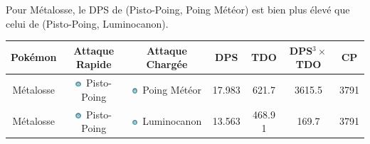 \documentclass[12pt]{beamer}
\newcommand{\psysimp}{\includegraphics[height=0.2cm]{../../../images/type/simplified/psy.png}}
\newcommand{\steelsimp}{\includegraphics[height=0.2cm]{../../../images/type/simplified/steel.png}}
\begin{document}
\begin{frame}
\begin{block}{}
\begin{footnotesize}
\begin{itemize}
Pour Métalosse, le DPS de (Pisto-Poing, Poing Météor) est bien plus élevé que celui de (Pisto-Poing, Luminocanon).
\begin{center}
\begin{tabular}{ccccccc}
Pok\'emon & Attaque Rapide & Attaque Chargée & DPS & TDO & DPS$^3 \times$ TDO & CP \\ \hline
Métalosse	 & \steelsimp~Pisto-Poing	& \steelsimp~Poing Météor&	17.983	&621.7	&3615.5	&3791\\
Métalosse	& \steelsimp~Pisto-Poing	& \steelsimp~Luminocanon &	13.563	&468.9	1&169.7&	3791\\
\end{tabular}
\end{center}
\end{itemize}

\end{footnotesize}
\end{block}
\end{frame}
\end{document}
